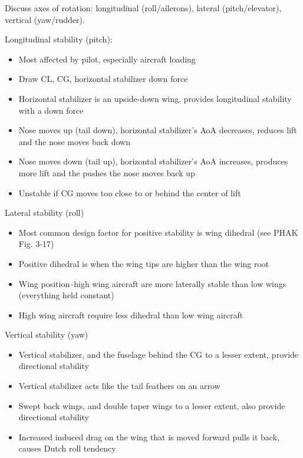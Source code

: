 Discuss axes of rotation: longitudinal (roll/ailerons), lateral
(pitch/elevator), vertical (yaw/rudder).

Longitudinal stability (pitch):

\begin{itemize}
  \item Most affected by pilot, especially aircraft loading

  \item Draw CL, CG, horizontal stabilizer down force

  \item Horizontal stabilizer is an upside-down wing, provides longitudinal
    stability with a down force

  \item Nose moves up (tail down), horizontal stabilizer's AoA decreases,
    reduces lift and the nose moves back down

  \item Nose moves down (tail up), horizontal stabilizer's AoA increases,
    produces more lift and the pushes the nose moves back up

  \item Unstable if CG moves too close to or behind the center of lift
\end{itemize}

Lateral stability (roll)

\begin{itemize}
  \item Most common design factor for positive stability is wing dihedral (see
    PHAK Fig. 3-17)

  \item Positive dihedral is when the wing tips are higher than the wing root

  \item Wing position--high wing aircraft are more laterally stable than low
    wings (everything held constant)

  \item High wing aircraft require less dihedral than low wing aircraft
\end{itemize}

Vertical stability (yaw)

\begin{itemize}
  \item Vertical stabilizer, and the fuselage behind the CG to a lesser extent,
    provide directional stability

  \item Vertical stabilizer acts like the tail feathers on an arrow

  \item Swept back wings, and double taper wings to a lesser extent, also
    provide directional stability

  \item Increased induced drag on the wing that is moved forward pulls it back,
    causes Dutch roll tendency
\end{itemize}

